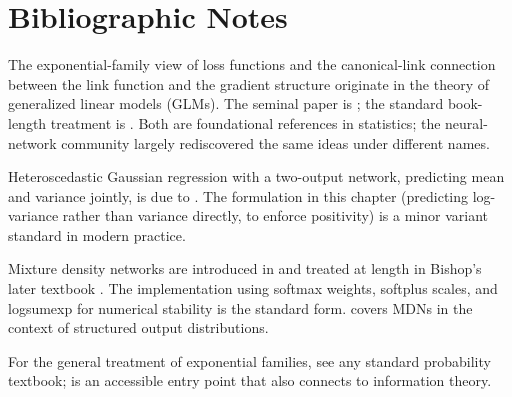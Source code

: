 
\section*{Bibliographic Notes}

The exponential-family view of loss functions and the canonical-link
connection between the link function and the gradient structure originate
in the theory of generalized linear models (GLMs). The seminal paper is
\textcite{nelder1972glm}; the standard book-length treatment is
\textcite{mccullagh1989glm}. Both are foundational references in
statistics; the neural-network community largely rediscovered the same
ideas under different names.

Heteroscedastic Gaussian regression with a two-output network, predicting
mean and variance jointly, is due to \textcite{nix1994heteroscedastic}.
The formulation in this chapter (predicting log-variance rather than
variance directly, to enforce positivity) is a minor variant standard in
modern practice.

Mixture density networks are introduced in \textcite{bishop1994mdn} and
treated at length in Bishop's later textbook
\parencite[chapter~5]{bishop2006prml}. The implementation using
softmax weights, softplus scales, and logsumexp for numerical stability
is the standard form. \textcite{goodfellow2016dlbook} covers MDNs in
the context of structured output distributions.

For the general treatment of exponential families, see any standard
probability textbook; \textcite{mackay2003information} is an accessible
entry point that also connects to information theory.
